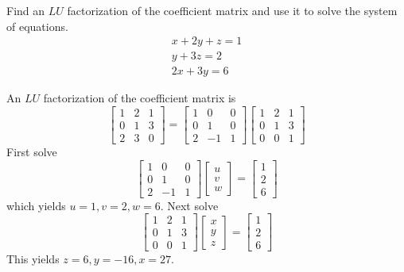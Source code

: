 \documentclass{ximera}
\begin{document}
\begin{problem}\label{prb:4.71} Find an $LU$ factorization of the coefficient matrix and use it to solve the system of equations.
\begin{equation*}
\begin{array}{c}
x+2y+z=1 \\
y+3z=2 \\
2x+3y=6
\end{array}
\end{equation*}
\begin{hint}
An $LU$ factorization of the coefficient matrix is
\[
\left[
\begin{array}{rrr}
1 & 2 & 1 \\
0 & 1 & 3 \\
2 & 3 & 0
\end{array}
\right] = \left[
\begin{array}{rrr}
1 & 0 & 0 \\
0 & 1 & 0 \\
2 & -1 & 1
\end{array}
\right] \left[
\begin{array}{rrr}
1 & 2 & 1 \\
0 & 1 & 3 \\
0 & 0 & 1
\end{array}
\right]
\]
First solve
\[
 \left[
\begin{array}{rrr}
1 & 0 & 0 \\
0 & 1 & 0 \\
2 & -1 & 1
\end{array}
\right] \left[
\begin{array}{c}
u \\
v \\
w
\end{array}
\right] =\left[
\begin{array}{c}
1 \\
2 \\
6
\end{array}
\right]
\]
which yields $u=1,v=2,w=6$. Next solve
\[
\left[
\begin{array}{rrr}
1 & 2 & 1 \\
0 & 1 & 3 \\
0 & 0 & 1
\end{array}
\right] \left[
\begin{array}{c}
x \\
y \\
z
\end{array}
\right] =\left[
\begin{array}{c}
1 \\
2 \\
6
\end{array}
\right]
\]
This yields $z=6,y=-16,x=27.$
\end{hint}
\end{problem}
\end{document}
